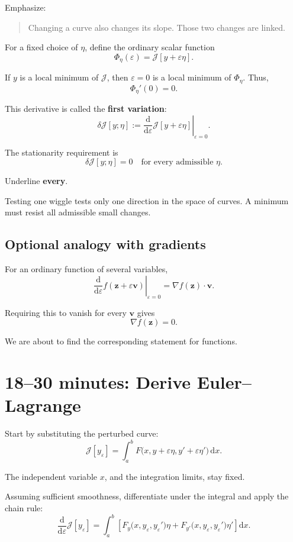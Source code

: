 \documentclass[11pt,a4paper]{article}
\newcommand{\dd}{\mathrm{d}}
\newcommand{\J}{\mathcal{J}}
\begin{document}
Emphasize:
\begin{quote}
Changing a curve also changes its slope.
Those two changes are linked.
\end{quote}

For a fixed choice of \(\eta\), define the ordinary scalar function
\[
\Phi_\eta(\varepsilon)
=
\J[y+\varepsilon\eta].
\]

If \(y\) is a local minimum of \(\J\), then \(\varepsilon=0\)
is a local minimum of \(\Phi_\eta\). Thus,
\[
\Phi_\eta'(0)=0.
\]

This derivative is called the \textbf{first variation}:
\[
\boxed{
\delta\J[y;\eta]
:=
\left.
\frac{\dd}{\dd\varepsilon}
\J[y+\varepsilon\eta]
\right|_{\varepsilon=0}.
}
\]

The stationarity requirement is
\[
\boxed{
\delta\J[y;\eta]=0
\quad
\text{for every admissible }\eta.
}
\]

Underline \textbf{every}.

Testing one wiggle tests only one direction in the space of curves.
A minimum must resist all admissible small changes.

\subsection*{Optional analogy with gradients}

For an ordinary function of several variables,
\[
\left.
\frac{\dd}{\dd\varepsilon}
f(\mathbf{z}+\varepsilon\mathbf{v})
\right|_{\varepsilon=0}
=
\nabla f(\mathbf{z})\cdot\mathbf{v}.
\]

Requiring this to vanish for every \(\mathbf{v}\) gives
\[
\nabla f(\mathbf{z})=0.
\]

We are about to find the corresponding statement for functions.

\section*{18--30 minutes: Derive Euler--Lagrange}

Start by substituting the perturbed curve:
\[
\J[y_\varepsilon]
=
\int_a^b
F\bigl(x,y+\varepsilon\eta,y'+\varepsilon\eta'\bigr)\,\dd x.
\]

The independent variable \(x\), and the integration limits, stay fixed.

Assuming sufficient smoothness, differentiate under the integral
and apply the chain rule:
\[
\frac{\dd}{\dd\varepsilon}\J[y_\varepsilon]
=
\int_a^b
\left[
F_y\bigl(x,y_\varepsilon,y_\varepsilon'\bigr)\eta
+
F_{y'}\bigl(x,y_\varepsilon,y_\varepsilon'\bigr)\eta'
\right]\dd x.
\]
\end{document}
